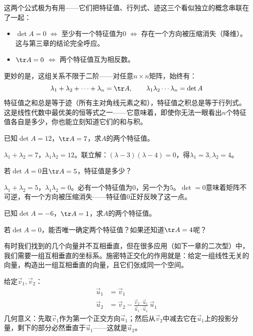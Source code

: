 这两个公式极为有用——它们把特征值、行列式、迹这三个看似独立的概念串联在了一起：
\begin{itemize}
\item $\det A=0$ $\Longleftrightarrow$ 至少有一个特征值为$0$ $\Longleftrightarrow$ 存在一个方向被压缩消失（降维）。这与第三章的结论完全呼应。
\item $\tr A=0$ $\Longleftrightarrow$ 两个特征值互为相反数。
\end{itemize}

更妙的是，这组关系不限于二阶——对任意$n\times n$矩阵，始终有：
\[
\lambda_1+\lambda_2+\cdots+\lambda_n = \tr A,\qquad
\lambda_1\lambda_2\cdots\lambda_n = \det A
\]
特征值之和总是等于迹（所有主对角线元素之和），特征值之积总是等于行列式。这是线性代数中最优美的恒等式之一——它意味着，即使你无法一眼看出$n$个特征值各自是多少，你也能立刻知道它们的和与积。

\begin{example}
已知$\det A=12$，$\tr A=7$，求$A$的两个特征值。
\end{example}
\begin{solution}
$\lambda_1+\lambda_2=7$，$\lambda_1\lambda_2=12$。联立解：$(\lambda-3)(\lambda-4)=0$，得$\lambda_1=3,\lambda_2=4$。
\end{solution}

\begin{example}
若$\det A=0$且$\tr A=5$，特征值是多少？
\end{example}
\begin{solution}
$\lambda_1+\lambda_2=5$，$\lambda_1\lambda_2=0$。必有一个特征值为$0$，另一个为$5$。$\det=0$意味着矩阵不可逆，有一个方向被压缩消失——特征值$0$正好反映了这一点。
\end{solution}

\begin{exercise}
\item 已知$\det A=-6$，$\tr A=1$，求$A$的两个特征值。
\item 若$\det A=0$，能否唯一确定两个特征值？如果还知道$\tr A=4$呢？
\end{exercise}


有时我们找到的几个向量并不互相垂直，但在很多应用（如下一章的二次型）中，我们需要一组互相垂直的坐标系。施密特正交化的作用就是：给定一组线性无关的向量，构造出一组互相垂直的向量，且它们张成同一个空间。

给定$\vec v_1,\vec v_2$：
\begin{align*}
\vec u_1 &= \vec v_1\\
\vec u_2 &= \vec v_2 - \frac{\vec v_2\cdot\vec u_1}{\vec u_1\cdot\vec u_1}\,\vec u_1
\end{align*}
几何意义：先取$\vec v_1$作为第一个正交方向$\vec u_1$；然后从$\vec v_2$中减去它在$\vec u_1$上的投影分量，剩下的部分必然垂直于$\vec u_1$——这就是$\vec u_2$。

